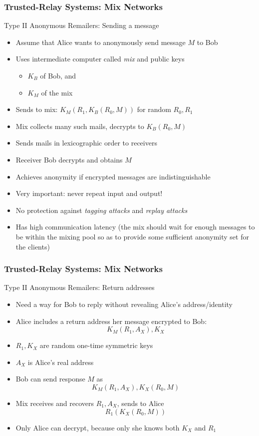 \begin{frame}
  \frametitle{Trusted-Relay Systems: Mix Networks}

  \begin{block}{Type II Anonymous Remailers: Sending a message}
  \begin{itemize}
    \item Assume that Alice wants to anonymously send message $M$ to Bob
    \item<2-> Uses intermediate computer called \emph{mix} and public keys
      \begin{itemize}
        \item $K_B$ of Bob, and
        \item $K_M$ of the mix
      \end{itemize}
    \item<3-> Sends to mix: $K_M(R_1,K_B(R_0,M))$ for random $R_0, R_1$
    \item<4-> Mix collects many such mails, decrypts to $K_B(R_0,M)$
    \item<5-> Sends mails in lexicographic order to receivers
    \item<5-> Receiver Bob decrypts and obtains $M$
    \item<6-> Achieves anonymity if encrypted messages are indistinguishable
    \item<6-> Very important: never repeat input and output!
    \item<6-> No protection against \emph{tagging attacks} and \emph{replay attacks}
    \item<6-> Has high communication latency (the mix should wait for enough
      messages to be within the mixing pool so as to provide some sufficient
      anonymity set for the clients)
  \end{itemize}
  \end{block}
\end{frame}


\begin{frame}
  \frametitle{Trusted-Relay Systems: Mix Networks}

  \begin{block}{Type II Anonymous Remailers: Return addresses}
  \begin{itemize}
    \item Need a way for Bob to reply without revealing Alice's address/identity
    \item<2-> Alice includes a return address her message encrypted to Bob:
      $$K_M(R_1,A_X),K_X$$
    \item<2-> $R_1, K_X$ are random one-time symmetric keys
    \item<2-> $A_X$ is Alice's real address
    \item<3-> Bob can send response $M$ as
      $$K_M(R_1,A_X),K_X(R_0,M)$$
    \item<4-> Mix receives and recovers $R_1, A_X$, sends to Alice
      $$R_1(K_X(R_0,M))$$
    \item<5-> Only Alice can decrypt, because only she knows both $K_X$ and $R_1$
  \end{itemize}
  \end{block}
\end{frame}


